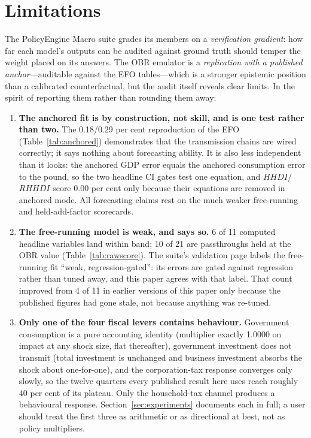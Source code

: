 \section{Limitations}
\label{sec:limitations}

The PolicyEngine Macro suite grades its members on a \emph{verification gradient}: how far each model's outputs can be audited against ground truth should temper the weight placed on its answers. The OBR emulator is a \emph{replication with a published anchor}---auditable against the EFO tables---which is a stronger epistemic position than a calibrated counterfactual, but the audit itself reveals clear limits. In the spirit of reporting them rather than rounding them away:

\begin{enumerate}
\item \textbf{The anchored fit is by construction, not skill, and is one test rather than two.} The 0.18/0.29 per cent reproduction of the EFO (Table~\ref{tab:anchored}) demonstrates that the transmission chains are wired correctly; it says nothing about forecasting ability. It is also less independent than it looks: the anchored GDP error equals the anchored consumption error to the pound, so the two headline CI gates test one equation, and $HHDI$/$RHHDI$ score 0.00 per cent only because their equations are removed in anchored mode. All forecasting claims rest on the much weaker free-running and held-add-factor scorecards.

\item \textbf{The free-running model is weak, and says so.} 6 of 11 computed headline variables land within band; 10 of 21 are passthroughs held at the OBR value (Table~\ref{tab:rawscore}). The suite's validation page labels the free-running fit ``weak, regression-gated'': its errors are gated against regression rather than tuned away, and this paper agrees with that label. That count improved from 4 of 11 in earlier versions of this paper only because the published figures had gone stale, not because anything was re-tuned.

\item \textbf{Only one of the four fiscal levers contains behaviour.} Government consumption is a pure accounting identity (multiplier exactly 1.0000 on impact at any shock size, flat thereafter), government investment does not transmit (total investment is unchanged and business investment absorbs the shock about one-for-one), and the corporation-tax response converges only slowly, so the twelve quarters every published result here uses reach roughly 40 per cent of its plateau. Only the household-tax channel produces a behavioural response. Section~\ref{sec:experiments} documents each in full; a user should treat the first three as arithmetic or as directional at best, not as policy multipliers.


\end{enumerate}
